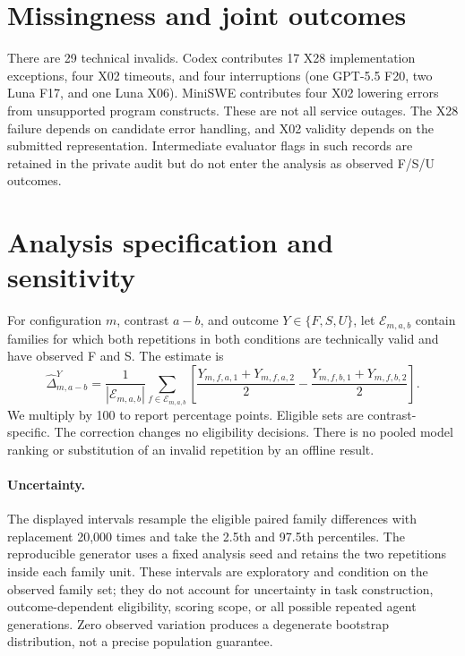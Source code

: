 \section{Missingness and joint outcomes}
\label{app:missingness}
\begin{table}[ht]
\centering\small
\caption{All families containing technical invalids. Every omitted configuration--family combination has eight valid recorded runs.}
\end{table}
There are 29 technical invalids. Codex contributes 17 X28 implementation exceptions, four X02 timeouts, and four interruptions (one GPT-5.5 F20, two Luna F17, and one Luna X06). MiniSWE contributes four X02 lowering errors from unsupported program constructs. These are not all service outages. The X28 failure depends on candidate error handling, and X02 validity depends on the submitted representation. Intermediate evaluator flags in such records are retained in the private audit but do not enter the analysis as observed F/S/U outcomes.

\begin{table}[p]
\centering\small
\caption{Condition-specific joint outcome counts. Each row has 26 recorded runs. $FS$ means functionality and focal-witness pass; $U$ means functionality pass and focal-witness fail. Invalids are outside all four scored categories.}
\end{table}

\section{Analysis specification and sensitivity}
\label{app:sensitivity}
For configuration $m$, contrast $a-b$, and outcome $Y\in\{F,S,U\}$, let $\mathcal{E}_{m,a,b}$ contain families for which both repetitions in both conditions are technically valid and have observed F and S. The estimate is
\begin{equation}
\widehat{\Delta}_{m,a-b}^{Y}=\frac{1}{|\mathcal{E}_{m,a,b}|}\sum_{f\in\mathcal{E}_{m,a,b}}\left[\frac{Y_{m,f,a,1}+Y_{m,f,a,2}}{2}-\frac{Y_{m,f,b,1}+Y_{m,f,b,2}}{2}\right].
\end{equation}
We multiply by 100 to report percentage points. Eligible sets are contrast-specific. The correction changes no eligibility decisions. There is no pooled model ranking or substitution of an invalid repetition by an offline result.

\paragraph{Uncertainty.}
The displayed intervals resample the eligible paired family differences with replacement 20,000 times and take the 2.5th and 97.5th percentiles. The reproducible generator uses a fixed analysis seed and retains the two repetitions inside each family unit. These intervals are exploratory and condition on the observed family set; they do not account for uncertainty in task construction, outcome-dependent eligibility, scoring scope, or all possible repeated agent generations. Zero observed variation produces a degenerate bootstrap distribution, not a precise population guarantee.

